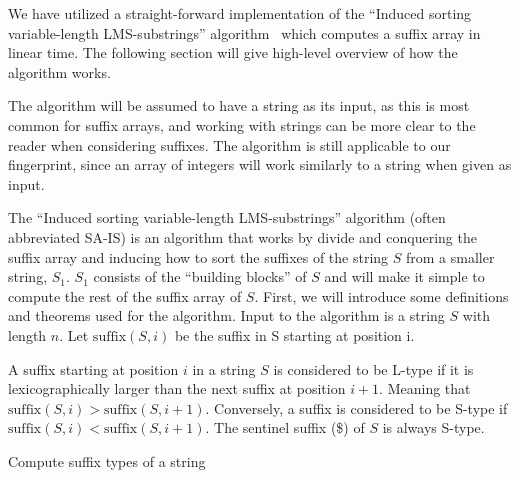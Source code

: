 We have utilized a straight-forward implementation of the ``Induced sorting
variable-length LMS-substrings'' algorithm~\cite{LinearTimeSuffixArraySAIS} which computes
a suffix array in linear time. The following section will give high-level overview of how
the algorithm works. 

The algorithm will be assumed to have a string as its input, as this is most common for
suffix arrays, and working with strings can be more clear to the reader when considering
suffixes. The algorithm is still applicable to our fingerprint, since an array of integers
will work similarly to a string when given as input.

The ``Induced sorting variable-length LMS-substrings'' algorithm (often abbreviated SA-IS)
is an algorithm that works by divide and conquering the suffix array and inducing how to
sort the suffixes of the string $S$ from a smaller string, $S_1$. $S_1$ consists of the
``building blocks'' of $S$ and will make it simple to compute the rest of the suffix array
of $S$. First, we will introduce some definitions and theorems used for the algorithm.
Input to the algorithm is a string $S$ with length $n$. Let $\mathrm{suffix}(S, i)$ be the
suffix in S starting at position i.

\begin{definition} A suffix starting at position $i$ in a
    string $S$ is considered to be L-type if it is lexicographically larger than the next
    suffix at position $i + 1$. Meaning that $\mathrm{suffix}(S, i) > \mathrm{suffix}(S,
    i+1)$. Conversely, a suffix is considered to be S-type if $\mathrm{suffix}(S, i) <
    \mathrm{suffix}(S, i+1)$. The sentinel suffix (\$) of $S$ is always S-type.
\end{definition}

\begin{algorithm}[htp]
  \SetAlgoLined\DontPrintSemicolon

  \vspace{0.5cm}
  \caption{Compute suffix types of a string}
  \label{alg:suffixtypes}
\end{algorithm}


